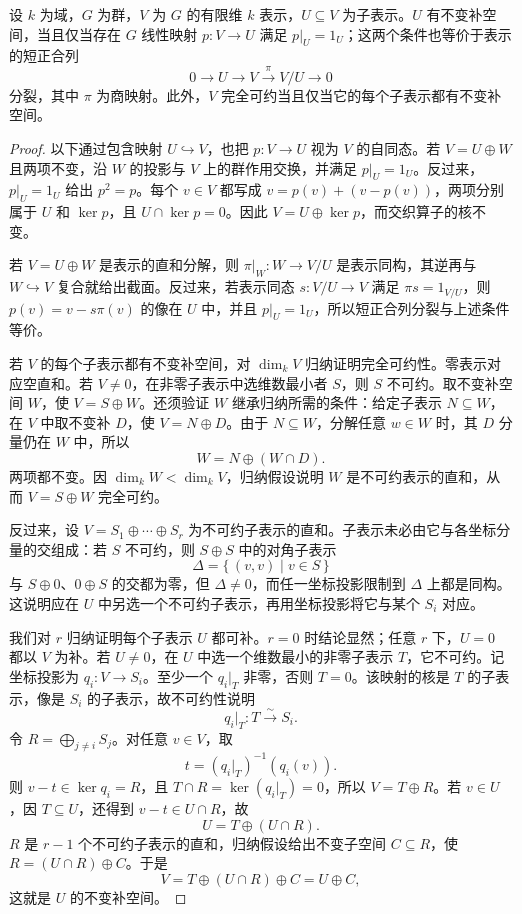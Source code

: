 \begin{proposition}\label{b5:prop:invariant-complement-projection}
	设 \(k\) 为域，\(G\) 为群，\(V\) 为 \(G\) 的有限维 \(k\) 表示，\(U\subseteq V\) 为子表示。\(U\) 有不变补空间，当且仅当存在 \(G\) 线性映射 \(p:V\to U\) 满足 \(p|_U=1_U\)；这两个条件也等价于表示的短正合列
	\[
		0\longrightarrow U\longrightarrow V\xrightarrow{\pi}V/U\longrightarrow0
	\]
	分裂，其中 \(\pi\) 为商映射。此外，\(V\) 完全可约当且仅当它的每个子表示都有不变补空间。
\end{proposition}
\begin{proof}
	以下通过包含映射 \(U\hookrightarrow V\)，也把 \(p:V\to U\) 视为 \(V\) 的自同态。若 \(V=U\oplus W\) 且两项不变，沿 \(W\) 的投影与 \(V\) 上的群作用交换，并满足 \(p|_U=1_U\)。反过来，\(p|_U=1_U\) 给出 \(p^2=p\)。每个 \(v\in V\) 都写成 \(v=p(v)+(v-p(v))\)，两项分别属于 \(U\) 和 \(\ker p\)，且 \(U\cap\ker p=0\)。因此 \(V=U\oplus\ker p\)，而交织算子的核不变。

	若 \(V=U\oplus W\) 是表示的直和分解，则 \(\pi|_W:W\to V/U\) 是表示同构，其逆再与 \(W\hookrightarrow V\) 复合就给出截面。反过来，若表示同态 \(s:V/U\to V\) 满足 \(\pi s=1_{V/U}\)，则 \(p(v)=v-s\pi(v)\) 的像在 \(U\) 中，并且 \(p|_U=1_U\)，所以短正合列分裂与上述条件等价。

	若 \(V\) 的每个子表示都有不变补空间，对 \(\dim_kV\) 归纳证明完全可约性。零表示对应空直和。若 \(V\ne0\)，在非零子表示中选维数最小者 \(S\)，则 \(S\) 不可约。取不变补空间 \(W\)，使 \(V=S\oplus W\)。还须验证 \(W\) 继承归纳所需的条件：给定子表示 \(N\subseteq W\)，在 \(V\) 中取不变补 \(D\)，使 \(V=N\oplus D\)。由于 \(N\subseteq W\)，分解任意 \(w\in W\) 时，其 \(D\) 分量仍在 \(W\) 中，所以
	\[
		W=N\oplus(W\cap D).
	\]
	两项都不变。因 \(\dim_kW<\dim_kV\)，归纳假设说明 \(W\) 是不可约表示的直和，从而 \(V=S\oplus W\) 完全可约。

	反过来，设 \(V=S_1\oplus\cdots\oplus S_r\) 为不可约子表示的直和。子表示未必由它与各坐标分量的交组成：若 \(S\) 不可约，则 \(S\oplus S\) 中的对角子表示
	\[
		\Delta=\{\,(v,v)\mid v\in S\,\}
	\]
	与 \(S\oplus0\)、\(0\oplus S\) 的交都为零，但 \(\Delta\ne0\)，而任一坐标投影限制到 \(\Delta\) 上都是同构。这说明应在 \(U\) 中另选一个不可约子表示，再用坐标投影将它与某个 \(S_i\) 对应。

	我们对 \(r\) 归纳证明每个子表示 \(U\) 都可补。\(r=0\) 时结论显然；任意 \(r\) 下，\(U=0\) 都以 \(V\) 为补。若 \(U\ne0\)，在 \(U\) 中选一个维数最小的非零子表示 \(T\)，它不可约。记坐标投影为 \(q_i:V\to S_i\)。至少一个 \(q_i|_T\) 非零，否则 \(T=0\)。该映射的核是 \(T\) 的子表示，像是 \(S_i\) 的子表示，故不可约性说明
	\[
		q_i|_T:T\xrightarrow{\sim}S_i.
	\]
	令 \(R=\bigoplus_{j\ne i}S_j\)。对任意 \(v\in V\)，取
	\[
		t=(q_i|_T)^{-1}(q_i(v)).
	\]
	则 \(v-t\in\ker q_i=R\)，且 \(T\cap R=\ker(q_i|_T)=0\)，所以 \(V=T\oplus R\)。若 \(v\in U\)，因 \(T\subseteq U\)，还得到 \(v-t\in U\cap R\)，故
	\[
		U=T\oplus(U\cap R).
	\]
	\(R\) 是 \(r-1\) 个不可约子表示的直和，归纳假设给出不变子空间 \(C\subseteq R\)，使 \(R=(U\cap R)\oplus C\)。于是
	\[
		V=T\oplus(U\cap R)\oplus C=U\oplus C,
	\]
	这就是 \(U\) 的不变补空间。
\end{proof}
